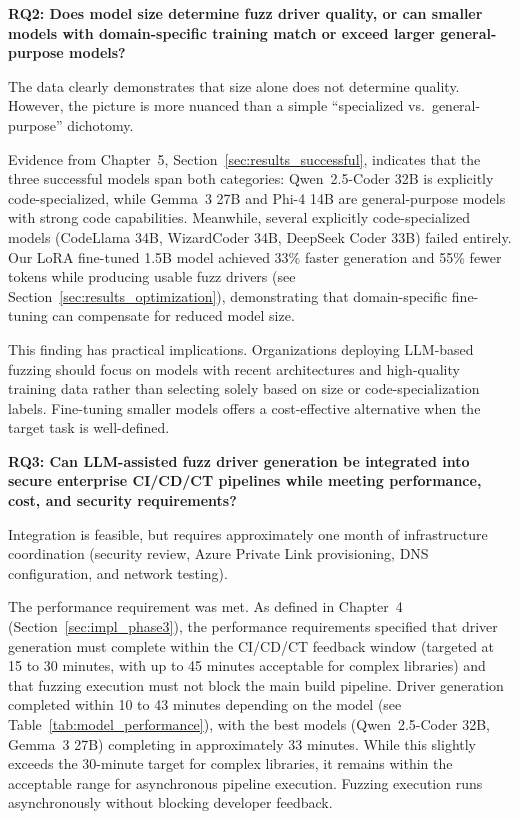 \textbf{RQ2: Does model size determine fuzz driver quality, or can smaller models with domain-specific training match or exceed larger general-purpose models?}

The data clearly demonstrates that size alone does not determine quality. However, the picture is more nuanced than a simple ``specialized vs.\ general-purpose'' dichotomy.

Evidence from Chapter~5, Section~\ref{sec:results_successful}, indicates that the three successful models span both categories: Qwen~2.5-Coder 32B is explicitly code-specialized, while Gemma~3 27B and Phi-4 14B are general-purpose models with strong code capabilities. Meanwhile, several explicitly code-specialized models (CodeLlama 34B, WizardCoder 34B, DeepSeek Coder 33B) failed entirely. Our LoRA fine-tuned 1.5B model achieved 33\% faster generation and 55\% fewer tokens while producing usable fuzz drivers (see Section~\ref{sec:results_optimization}), demonstrating that domain-specific fine-tuning can compensate for reduced model size.

This finding has practical implications. Organizations deploying LLM-based fuzzing should focus on models with recent architectures and high-quality training data rather than selecting solely based on size or code-specialization labels. Fine-tuning smaller models offers a cost-effective alternative when the target task is well-defined.

\textbf{RQ3: Can LLM-assisted fuzz driver generation be integrated into secure enterprise CI/CD/CT pipelines while meeting performance, cost, and security requirements?}

Integration is feasible, but requires approximately one month of infrastructure coordination (security review, Azure Private Link provisioning, DNS configuration, and network testing).

The performance requirement was met. As defined in Chapter~4 (Section~\ref{sec:impl_phase3}), the performance requirements specified that driver generation must complete within the CI/CD/CT feedback window (targeted at 15 to 30 minutes, with up to 45 minutes acceptable for complex libraries) and that fuzzing execution must not block the main build pipeline. Driver generation completed within 10 to 43 minutes depending on the model (see Table~\ref{tab:model_performance}), with the best models (Qwen~2.5-Coder 32B, Gemma~3 27B) completing in approximately 33 minutes. While this slightly exceeds the 30-minute target for complex libraries, it remains within the acceptable range for asynchronous pipeline execution. Fuzzing execution runs asynchronously without blocking developer feedback.

